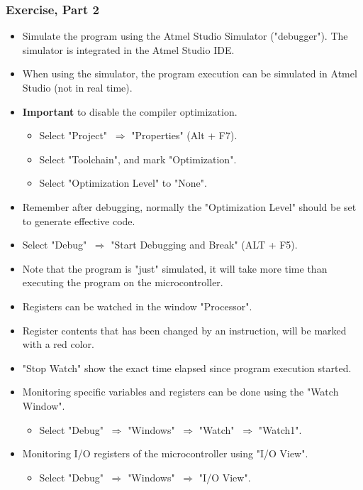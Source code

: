 \subsubsection{Exercise, Part 2}
\begin{itemize}
	\item Simulate the program using the Atmel Studio Simulator ("debugger"). The simulator is integrated in the Atmel Studio IDE.
	\item When using the simulator, the program execution can be simulated in Atmel Studio (not in real time). 
	\item \textbf{Important} to disable the compiler optimization.
	\begin{itemize}
		\item Select "Project" $\:\Rightarrow$ "Properties" (Alt + F7).
		\item Select "Toolchain", and mark "Optimization".
		\item Select "Optimization Level" to "None".
	\end{itemize}
	\item  Remember after debugging, normally the "Optimization Level" should be set to	generate effective code.
	\item Select "Debug" $\:\Rightarrow$ "Start Debugging and Break" (ALT + F5).
	\item Note that the program is "just" simulated, it will take more time than executing the program on the microcontroller.
	\item Registers can be watched in the window "Processor".
	\item Register contents that has been changed by an instruction, will be marked with a red color.
	\item "Stop Watch" show the exact time elapsed since program execution started.
	\item Monitoring specific variables and registers can be done using the "Watch Window". 
	\begin{itemize}
		\item Select "Debug" $\:\Rightarrow$ "Windows" $\:\Rightarrow$ "Watch" $\:\Rightarrow$ "Watch1".
	\end{itemize} 
	\item  Monitoring I/O registers of the microcontroller using "I/O View".
	\begin{itemize}
		\item Select "Debug" $\:\Rightarrow$ "Windows" $\:\Rightarrow$ "I/O View".
	\end{itemize}
\end{itemize}

